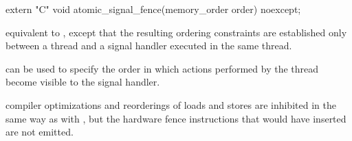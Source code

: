 %
\begin{itemdecl}
extern "C" void atomic_signal_fence(memory_order order) noexcept;
\end{itemdecl}

\begin{itemdescr}
\pnum
\effects equivalent to , except that
the resulting ordering constraints are established only between a thread and a
signal handler executed in the same thread.

\pnum
\realnote {} can be used to specify the order in which actions
performed by the thread become visible to the signal handler.

\pnum
\realnote compiler optimizations and reorderings of loads and stores are inhibited in
the same way as with , but the hardware fence instructions
that  would have inserted are not emitted.
\end{itemdescr}
